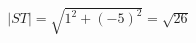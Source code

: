 \documentclass[preview]{standalone}
\begin{document}
\begin{align*}
|ST| = \sqrt{1^2 + (-5)^2} = \sqrt{26}
\end{align*}
\end{document}
